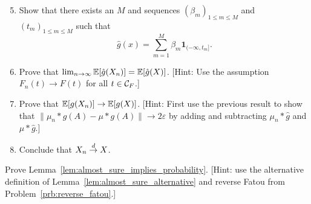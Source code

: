 \begin{problem}
\begin{enumerate}[label={(\alph*)}]
\setcounter{enumi}{4}
\item Show that there exists an $M$ and sequences $(\beta_m)_{1 \le m \le M}$ and $(t_m)_{1 \le m \le M}$ such that
\[
	\hat{g}(x) = \sum_{m = 1}^M \beta_m \mathbf{1}_{(-\infty, t_m]}.
\]
\item Prove that $\lim_{n \to \infty} \mathbb E[\hat{g}(X_n)] = \mathbb E[\hat{g}(X)]$. [Hint: Use the assumption $F_n(t) \to F(t)$ for all $t \in \mathcal C_F$.]
\item Prove that $\mathbb E[g(X_n)] \to \mathbb E[g(X)]$. [Hint: First use the previous result to show that $\|\mu_n \ast g(A) - \mu \ast g(A)\| \to 2\varepsilon$ by adding and subtracting $\mu_n \ast \hat{g}$ and $\mu \ast \hat{g}$.]
\item Conclude that $X_n \stackrel{d}{\rightarrow} X$.
\end{enumerate}
\end{problem}

\begin{problem}\label{prb:almost_sure_implies_probability}
Prove Lemma~\ref{lem:almost_sure_implies_probability}. [Hint: use the alternative definition of Lemma~\ref{lem:almost_sure_alternative} and reverse Fatou from Problem~\ref{prb:reverse_fatou}.]
\end{problem}